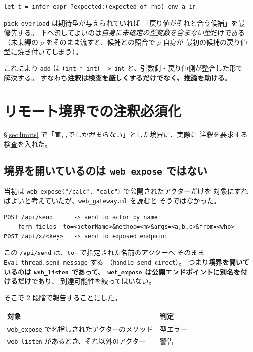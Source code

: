 \documentclass[11pt,a4paper]{ltjsarticle}
\theoremstyle{definition}
\theoremstyle{remark}
\begin{document}
\begin{lstlisting}
let t = infer_expr ?expected:(expected_of rho) env a in
\end{lstlisting}

\texttt{pick\_overload} は期待型が与えられていれば
「戻り値がそれと合う候補」を最優先する。
下へ流してよいのは\emph{自身に未確定の型変数を含まない型}だけである
（未束縛の $\rho$ をそのまま流すと、候補との照合で $\rho$ 自身が
最初の候補の戻り値型に焼き付いてしまう）。

これにより \texttt{add} は
\texttt{(int * int) -> int} と、引数側・戻り値側が整合した形で解決する。
すなわち\textbf{注釈は検査を厳しくするだけでなく、推論を助ける}。

\section{リモート境界での注釈必須化}
\label{sec:boundary}

\S\ref{sec:limits} で「宣言でしか埋まらない」とした境界に、実際に
注釈を要求する検査を入れた。

\subsection{境界を開いているのは \texttt{web\_expose} ではない}

当初は \texttt{web\_expose("/calc", "calc")} で公開されたアクターだけを
対象にすればよいと考えていたが、\texttt{web\_gateway.ml} を読むと
そうではなかった。

\begin{lstlisting}[language={}]
POST /api/send      -> send to actor by name
    form fields: to=<actorName>&method=<m>&args=<a,b,c>&from=<who>
POST /api/x/<key>   -> send to exposed endpoint
\end{lstlisting}

この \texttt{/api/send} は、\texttt{to=} で指定された名前のアクターへ
そのまま \texttt{Eval\_thread.send\_message} する
（\texttt{handle\_send\_direct}）。
つまり\textbf{境界を開いているのは \texttt{web\_listen} であって、
\texttt{web\_expose} は公開エンドポイントに別名を付けるだけ}であり、
到達可能性を絞ってはいない。

そこで 2 段階で報告することにした。

\begin{center}
\begin{tabular}{ll}
\toprule
対象 & 判定 \\
\midrule
\texttt{web\_expose} で名指しされたアクターのメソッド & 型エラー \\
\texttt{web\_listen} があるとき、それ以外のアクター & 警告 \\
\bottomrule
\end{tabular}
\end{center}
\end{document}
